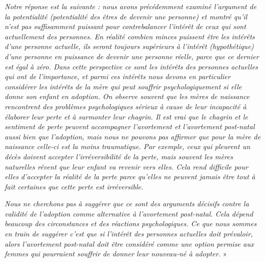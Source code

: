 \begin{displayquote}
\emph{Notre réponse est la suivante : nous avons précédemment examiné l'argument de la potentialité (potentialité des êtres de devenir une personne) et montré qu'il n'est pas suffisamment puissant pour contrebalancer l'intérêt de ceux qui sont actuellement des personnes. En réalité combien minces puissent être les intérêts d'une personne actuelle, ils seront toujours supérieurs à l'intérêt (hypothétique) d'une personne en puissance de devenir une personne réelle, parce que ce dernier est égal à zéro. Dans cette perspective ce sont les intérêts des personnes actuelles qui ont de l'importance, et parmi ces intérêts nous devons en particulier considérer les intérêts de la mère qui peut souffrir psychologiquement si elle donne son enfant en adoption. On observe souvent que les mères de naissance rencontrent des problèmes psychologiques sérieux à cause de leur incapacité à élaborer leur perte et à surmonter leur chagrin. Il est vrai que le chagrin et le sentiment de perte peuvent accompagner l'avortement et l'avortement post-natal aussi bien que l'adoption, mais nous ne pouvons pas affirmer que pour la mère de naissance celle-ci est la moins traumatique. Par exemple, ceux qui pleurent un décès doivent accepter l'irréversibilité de la perte, mais souvent les mères naturelles rêvent que leur enfant va revenir vers elles. Cela rend difficile pour elles d'accepter la réalité de la perte parce qu'elles ne peuvent jamais être tout à fait certaines que cette perte est irréversible.}

\emph{Nous ne cherchons pas à suggérer que ce sont des arguments décisifs contre la validité de l'adoption comme alternative à l'avortement post-natal. Cela dépend beaucoup des circonstances et des réactions psychologiques. Ce que nous sommes en train de suggérer c'est que si l'intérêt des personnes actuelles doit prévaloir, alors l'avortement post-natal doit être considéré comme une option permise aux femmes qui pourraient souffrir de donner leur nouveau-né à adopter.} »

\end{displayquote}

